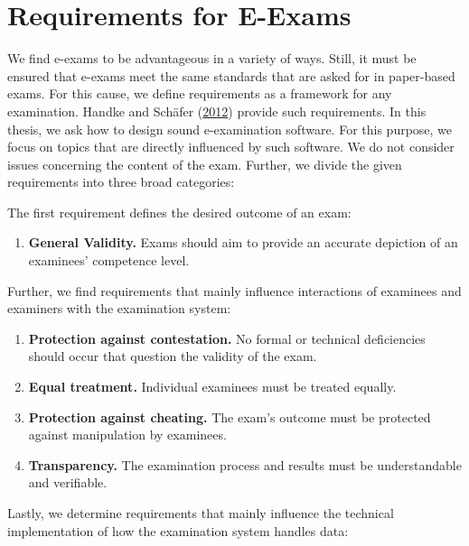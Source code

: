 \newpage

\hypertarget{requirements-for-e-exams}{%
\section{Requirements for E-Exams}\label{requirements-for-e-exams}}

We find e-exams to be advantageous in a variety of ways. Still, it must
be ensured that e-exams meet the same standards that are asked for in
paper-based exams. For this cause, we define requirements as a framework
for any examination. Handke and Schäfer
(\protect\hyperlink{ref-Handke2012}{2012}) provide such requirements. In
this thesis, we ask how to design sound e-examination software. For this
purpose, we focus on topics that are directly influenced by such
software. We do not consider issues concerning the content of the exam.
Further, we divide the given requirements into three broad categories:

The first requirement defines the desired outcome of an exam:

\begin{enumerate}
\def\labelenumi{\arabic{enumi}.}
\tightlist
\item
  \textbf{General Validity.} Exams should aim to provide an accurate
  depiction of an examinees' competence level.
\end{enumerate}

Further, we find requirements that mainly influence interactions of
examinees and examiners with the examination system:

\begin{enumerate}
\def\labelenumi{\arabic{enumi}.}
\setcounter{enumi}{1}
\tightlist
\item
  \textbf{Protection against contestation.} No formal or technical
  deficiencies should occur that question the validity of the exam.
\item
  \textbf{Equal treatment.} Individual examinees must be treated
  equally.
\item
  \textbf{Protection against cheating.} The exam's outcome must be
  protected against manipulation by examinees.
\item
  \textbf{Transparency.} The examination process and results must be
  understandable and verifiable.
\end{enumerate}

Lastly, we determine requirements that mainly influence the technical
implementation of how the examination system handles data:

